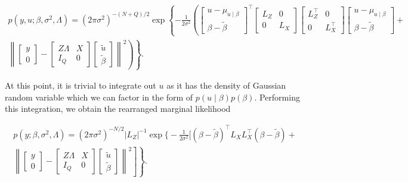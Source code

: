 \documentclass[article,shortnames]{jss}
\begin{document}
\begin{multline*}
  p(y, u; \beta, \sigma^2, \Lambda) = (2\pi \sigma^2)^{-(N+Q)/2}
  \exp\left\{-\frac{1}{2\sigma^2} \left( \begin{bmatrix} u -
        \mu_{u\mid \beta} \\
        \beta - \tilde{\beta} \end{bmatrix}^\top
      \begin{bmatrix} L_Z & 0 \\ 0 & L_X \end{bmatrix}
      \begin{bmatrix} L_Z^\top & 0 \\ 0 & L_X^\top \end{bmatrix}
      \begin{bmatrix} u - \mu_{u \mid \beta} \\ \beta - \tilde{\beta} \end{bmatrix} + \right.\right. \\
      \left.\left.\left\|\begin{bmatrix} y \\ 0 \end{bmatrix} - \begin{bmatrix} Z
          \Lambda & X \\ I_Q & 0 \end{bmatrix} \begin{bmatrix} \tilde{u} \\
          \tilde{\beta}\end{bmatrix}\right\|^2\right) \right\}.
\end{multline*}

At this point, it is trivial to integrate out $u$ as it has the
density of Gaussian random variable which we can factor in the form
of $p(u\mid \beta)p(\beta)$. Performing this integration, we obtain the rearranged marginal likelihood

\begin{multline}
  p(y; \beta, \sigma^2, \Lambda) = (2\pi\sigma^2)^{-N/2} |L_Z|^{-1}
  \exp\Bigg\{-\frac{1}{2\sigma^2}\Bigg[(\beta - \tilde{\beta})^\top
  L_XL_X^\top (\beta - \tilde{\beta}) + \\ 
  \left.\left.\left\| \begin{bmatrix} y \\
          0 \end{bmatrix} - \begin{bmatrix} Z \Lambda & X \\ I_Q & 0 \end{bmatrix}
        \begin{bmatrix} \tilde{u} \\ \tilde{\beta} \end{bmatrix} \right\|^2\right]\right\}.
\label{eq:likelihood}
\end{multline}
\end{document}
